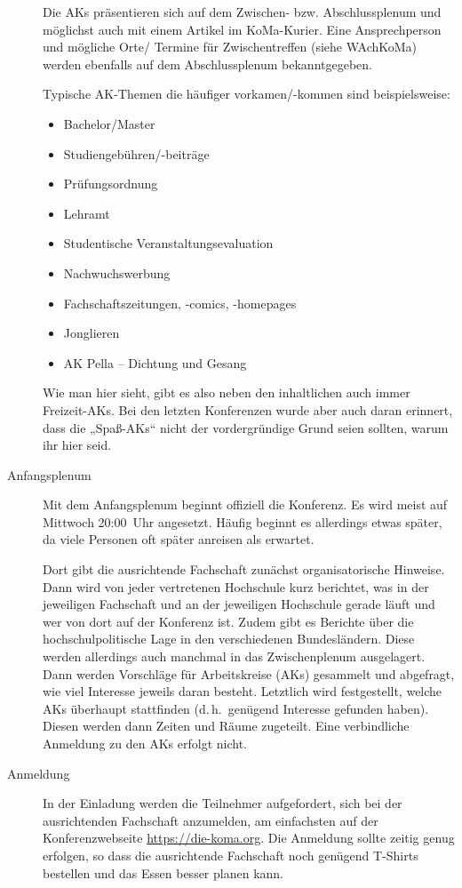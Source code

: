 \begin{description}
	Die AKs präsentieren sich auf dem Zwischen- bzw. Abschlussplenum und möglichst
	auch mit einem Artikel im KoMa-Kurier. Eine Ansprechperson und mögliche
	Orte/ Termine für Zwischentreffen (siehe WAchKoMa) werden ebenfalls auf
	dem Abschlussplenum bekanntgegeben.

	Typische AK-Themen die häufiger vorkamen/-kommen sind beispielsweise:
	\begin{itemize}
		\item Bachelor/Master
		\item Studiengebühren/-beiträge
		\item Prüfungsordnung
		\item Lehramt
		\item Studentische Veranstaltungsevaluation
		\item Nachwuchswerbung
		\item Fachschaftszeitungen, -comics, -homepages
		\item Jonglieren
		\item AK Pella – Dichtung und Gesang
	\end{itemize}
	Wie man hier sieht, gibt es also neben den inhaltlichen auch immer
	Freizeit-AKs. Bei den letzten Konferenzen wurde aber auch daran
	erinnert, dass die „Spaß-AKs“ nicht der vordergründige Grund seien
	sollten, warum ihr hier seid.

\item[Anfangsplenum] Mit dem Anfangsplenum beginnt offiziell die Konferenz. Es
	wird meist auf Mittwoch 20:00~Uhr angesetzt.  Häufig beginnt es allerdings
	etwas später, da viele Personen oft später anreisen als erwartet.

	Dort gibt die ausrichtende Fachschaft zunächst organisatorische Hinweise. Dann
	wird von jeder vertretenen Hochschule kurz berichtet, was in der
	jeweiligen Fachschaft und an der jeweiligen Hochschule gerade läuft und
	wer von dort auf der Konferenz ist. Zudem gibt es Berichte über die
	hochschulpolitische Lage in den verschiedenen Bundesländern. Diese
	werden allerdings auch manchmal in das Zwischenplenum ausgelagert. Dann
	werden Vorschläge für Arbeitskreise (AKs) gesammelt und abgefragt, wie
	viel Interesse jeweils daran besteht. Letztlich wird festgestellt,
	welche AKs überhaupt stattfinden (d.\,h.\ genügend Interesse gefunden
	haben). Diesen werden dann Zeiten und Räume zugeteilt. Eine
	verbindliche Anmeldung zu den AKs erfolgt nicht.

\item[Anmeldung] In der Einladung werden die Teilnehmer aufgefordert, sich bei
	der ausrichtenden Fachschaft anzumelden, am einfachsten auf der
	Konferenzwebseite \url{https://die-koma.org}. Die Anmeldung sollte zeitig
	genug erfolgen, so dass die ausrichtende Fachschaft noch genügend T-Shirts
	bestellen und das Essen besser planen kann.


\end{description}
